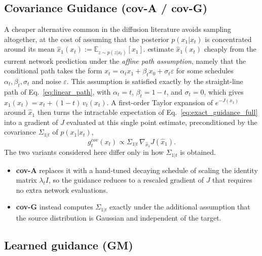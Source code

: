 \documentclass{article}
\begin{document}
\subsection{Covariance Guidance (cov-A / cov-G)}

A cheaper alternative common in the diffusion literature avoids sampling altogether, at the cost of assuming that the posterior $p(x_1|x_t)$ is concentrated around its mean $\hat{x}_1(x_t) := \mathbb{E}_{z \sim p(z|x_t)}[x_1]$.
\citet{feng25s_guidance} estimate $\hat{x}_1(x_t)$ cheaply from the current network prediction under the \emph{affine path assumption}, namely that the conditional path takes the form $x_t = \alpha_t x_1 + \beta_t x_0 + \sigma_t \varepsilon$ for some schedules $\alpha_t,\beta_t,\sigma_t$ and noise $\varepsilon$.
This assumption is satisfied exactly by the straight-line path of Eq.~\eqref{eq:linear_path}, with $\alpha_t = t$, $\beta_t = 1-t$, and $\sigma_t = 0$, which gives $\hat{x}_1(x_t) = x_t + (1-t)\,v_t(x_t)$.
A first-order Taylor expansion of $e^{-J(x_1)}$ around $\hat{x}_1$ then turns the intractable expectation of Eq.~\eqref{eq:exact_guidance_full} into a gradient of $J$ evaluated at this single point estimate, preconditioned by the covariance $\Sigma_{1|t}$ of $p(x_1|x_t)$,
\begin{equation}
    g_t^{cov}(x_t) \propto \Sigma_{1|t}\, \nabla_{\hat{x}_1} J(\hat{x}_1).
    \label{eq:cov_guidance}
\end{equation}
The two variants considered here differ only in how $\Sigma_{1|t}$ is obtained.
\begin{itemize}
\item \textbf{cov-A} replaces it with a hand-tuned decaying schedule of scaling the identity matrix $\lambda_t I$, so the guidance reduces to a rescaled gradient of $J$ that requires no extra network evaluations.
\item \textbf{cov-G} instead computes $\Sigma_{1|t}$ exactly under the additional assumption that the source distribution is Gaussian and independent of the target.
\end{itemize}

\subsection{Learned guidance (GM)}
\end{document}
